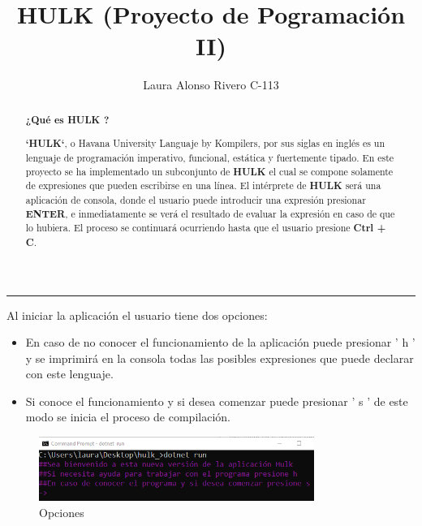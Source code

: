 \documentclass{article}
\begin{document}
\title{ \textbf{HULK} (Proyecto de Pogramación II)}
\author{ Laura Alonso Rivero C-113}
\date{}
\maketitle
\rule{1.0\textwidth}{0.1mm}

\begin{flushleft}
\begin{abstract}
\begin{center}
\textbf{¿Qué es HULK ?}
\end{center}
\textbf{`HULK`}, o Havana University Languaje by Kompilers, por sus siglas en inglés es un lenguaje de programación imperativo, funcional, estática y fuertemente tipado. En este proyecto se ha implementado un subconjunto de \textbf{ HULK} el cual se compone solamente de expresiones que pueden escribirse en una línea.
El intérprete de \textbf{ HULK} será una aplicación de consola, donde el usuario puede introducir una expresión presionar  \textbf{ ENTER}, e inmediatamente se verá el resultado de evaluar la expresión en caso de que lo hubiera. El proceso se continuará ocurriendo hasta que el usuario presione \textbf{Ctrl + C}.
\end{abstract}

\large {Al iniciar la aplicación el usuario tiene dos opciones:}
\begin{itemize}
\item \large {En caso de no conocer el funcionamiento de la aplicación puede presionar ' h ' y se imprimirá en la consola todas las posibles expresiones que puede declarar con este lenguaje.}
\item \large {Si conoce el funcionamiento y si  desea comenzar puede presionar ' s '  de este modo se inicia el proceso de compilación.}
\end{itemize}
\end{flushleft}

\begin{figure}
[!h]\label{Opciones}
\centering
\includegraphics[width = 0.8\textwidth]{Opciones.png}
\caption{Opciones}
\end{figure}
\end{document}
